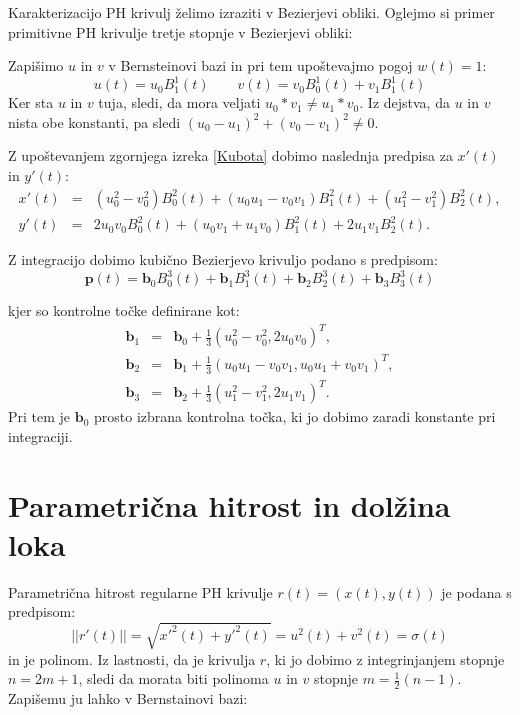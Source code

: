 \documentclass[12pt]{article}
\begin{document}
Karakterizacijo PH krivulj želimo izraziti v Bezierjevi obliki.
Oglejmo si primer primitivne PH krivulje tretje stopnje v Bezierjevi obliki:

Zapišimo $u$ in $v$ v Bernsteinovi bazi in pri tem upoštevajmo pogoj $w(t) = 1$:
$$u(t) = u_0 B^1_1(t) \quad \quad v(t) = v_0 B^1_0(t) + v_1 B^1_1(t)$$
Ker sta $u$ in $v$ tuja, sledi, da mora veljati $u_0*v_1 \neq u_1*v_0$. Iz dejstva, da
$u$ in $v$ nista obe konstanti, pa sledi $(u_0 - u_1)^2 + (v_0 - v_1)^2 \neq 0$.

Z upoštevanjem zgornjega izreka \ref{Kubota} dobimo naslednja predpisa za $x'(t)$ in $y'(t)$:
\begin{eqnarray}
	x'(t) &=& (u_0^2 - v_0^2)B_0^2(t) + (u_0 u_1 - v_0 v_1) B_1^2(t) + (u_1^2 - v_1^2) B_2^2(t),\nonumber\\
	y'(t) &=& 2 u_0 v_0 B_0^2(t) + (u_0 v_1 + u_1 v_0) B_1^2(t) + 2 u_1 v_1 B_2^2(t).\nonumber
\end{eqnarray}

Z integracijo dobimo kubično Bezierjevo krivuljo podano s predpisom:
$$\textbf{p}(t) = \textbf{b}_0 B_0^3(t) + \textbf{b}_1 B_1^3(t) + \textbf{b}_2 B_2^3(t) + \textbf{b}_3 B_3^3(t)$$

kjer so kontrolne točke definirane kot:
\begin{eqnarray}
	\textbf{b}_1 &=& \textbf{b}_0 + \frac{1}{3}(u_0^2 - v_0^2, 2 u_0 v_0)^T,\nonumber\\
	\textbf{b}_2 &=& \textbf{b}_1 + \frac{1}{3}(u_0 u_1 - v_0 v_1, u_0 u_1 + v_0 v_1)^T,\nonumber\\
	\textbf{b}_3 &=& \textbf{b}_2 + \frac{1}{3} (u_1^2 - v_1^2, 2 u_1 v_1)^T.\nonumber
\end{eqnarray}
Pri tem je $\textbf{b}_0$ prosto izbrana kontrolna točka, ki jo dobimo zaradi konstante pri integraciji.
\section{Parametrična hitrost in dolžina loka}

Parametrična hitrost regularne PH krivulje $r(t) = (x(t), y(t))$ je podana s predpisom:
$$ || r\prime (t) || =\sqrt{x\prime^2(t)+y\prime^2(t)}= u^2 (t) + v^2 (t) = \sigma (t)$$
in je polinom. \newline
Iz lastnosti, da je krivulja $r$, ki jo dobimo z integrinjanjem stopnje $n = 2m + 1$, sledi
da morata biti polinoma $u$ in $v$ stopnje  $m = \frac{1}{2}(n - 1)$. Zapišemu ju lahko v 
Bernstainovi bazi:
\end{document}
